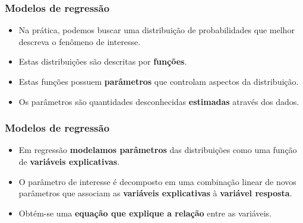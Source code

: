\documentclass[10pt,
  aspectratio=169,
  serif,
  mathserif,
  professionalfont,
  compress,
  handout,
  ]{beamer}\usepackage[]{graphicx}\usepackage[]{color}
\begin{document}
\begin{frame}
  
  \frametitle{Modelos de regressão}

  \begin{itemize}
    \itemsep 2ex
  
  \item Na prática, podemos buscar uma distribuição de probabilidades que melhor descreva o fenômeno de interesse. 
  
  \item Estas distribuições são descritas por \textbf{funções}. 
  
  \item Estas funções possuem \textbf{parâmetros} que controlam aspectos da distribuição.
  
  \item Os parâmetros são quantidades desconhecidas \textbf{estimadas} através dos dados.
  
  \end{itemize}

\end{frame}


\begin{frame}
  \frametitle{Modelos de regressão}

  \begin{itemize}
    \itemsep 2ex

  \item Em regressão \textbf{modelamos parâmetros} das distribuições como uma função de \textbf{variáveis explicativas}.
  
  \item O parâmetro de interesse é decomposto em uma combinação linear de novos parâmetros que associam as \textbf{variáveis explicativas} à \textbf{variável resposta}.
  
  \item Obtém-se uma \textbf{equação que explique a relação} entre as variáveis. 
  
  \end{itemize}
\end{frame}

\end{document}
